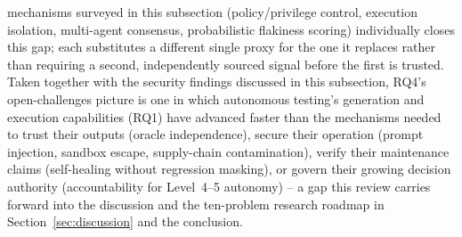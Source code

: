 mechanisms surveyed in this subsection (policy/privilege control,
execution isolation, multi-agent consensus, probabilistic flakiness scoring)
individually closes this gap; each substitutes a different single
proxy for the one it replaces rather than requiring a second,
independently sourced signal before the first is trusted. Taken
together with the security findings discussed in this subsection,
RQ4's open-challenges picture is one in which autonomous testing's
generation and execution capabilities (RQ1) have advanced faster than
the mechanisms needed to trust their outputs (oracle independence),
secure their operation (prompt injection, sandbox escape, supply-chain contamination),
verify their maintenance claims (self-healing without regression masking),
or govern their growing decision authority (accountability for
Level~4--5 autonomy) -- a gap this review carries forward into the
discussion and the ten-problem research roadmap in
Section~\ref{sec:discussion} and the conclusion.
